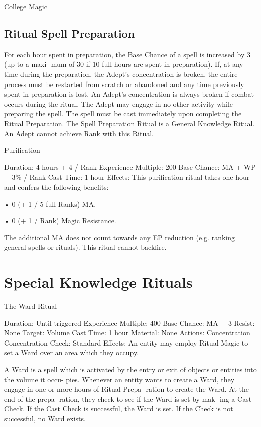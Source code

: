 \begin{Chapter}{College Magic}
\subsection{Ritual Spell Preparation}

For each hour spent in preparation, the Base Chance of a spell is
increased by 3 (up to a maxi- mum of 30 if 10 full hours are spent in
preparation).  If, at any time during the preparation, the Adept’s
concentration is broken, the entire process must be restarted from
scratch or abandoned and any time previously spent in preparation is
lost. An Adept’s concentration is always broken if combat occurs
during the ritual. The Adept may engage in no other activity while
preparing the spell.  The spell must be cast immediately upon
completing the Ritual Preparation.  The Spell Preparation Ritual is
a General Knowledge Ritual.  An Adept cannot achieve Rank with this
Ritual.


\begin{ritual}{Purification}

Duration: 4 hours + 4 / Rank 
Experience Multiple: 200 
Base Chance: MA + WP + 3\% / Rank 
Cast Time: 1 hour 
Effects: This purification ritual takes one hour and 
confers the following benefits:  

• 0 (+ 1 / 5 full Ranks) MA.  

• 0 (+ 1 / Rank) Magic Resistance. 

The additional MA does not count towards any EP 
reduction  (e.g.  ranking  general  spells  or  rituals). 
This ritual cannot backfire. 
\end{ritual}


\section{Special Knowledge Rituals}

\begin{ritual}{The Ward Ritual}

Duration: Until triggered 
Experience Multiple: 400 
Base Chance: MA + 3%
Resist: None 
Target: Volume 
Cast Time: 1 hour 
Material: None 
Actions: Concentration 
Concentration Check: Standard 
Effects: An entity may employ Ritual Magic to set 
a Ward over an area which they occupy. 

A Ward is a spell which is activated by the entry or 
exit  of  objects  or  entities  into  the  volume  it  occu-
pies.  Whenever  an  entity  wants  to  create  a  Ward, 
they engage in one or more hours of Ritual Prepa-
ration to create the Ward. At the end of the prepa-
ration, they check to see if the Ward is set by mak-
ing  a Cast Check.  If  the  Cast  Check is  successful, 
the Ward  is  set.  If  the  Check is  not successful,  no 
Ward exists. 


\end{ritual}
\end{Chapter}
